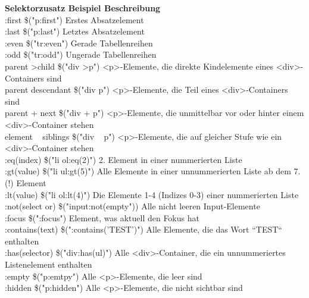 \documentclass[10pt]{article}
\begin{document}
    \begin{tcolorbox}[
    colback=Red!5!white,
    colframe=Red!75!black,
    title={\centering Selektorenzusätze}]
        \textbf{Selektorzusatz  Beispiel  Beschreibung} \\
        :first  \$("p:first")  Erstes Absatzelement \\
        :last  \$("p:last")  Letztes Absatzelement \\
        :even  \$("tr:even")  Gerade Tabellenreihen \\
        :odd  \$("tr:odd")  Ungerade Tabellenreihen \\
        parent \textgreater  child  \$("div \textgreater  p")  \textless p\textgreater -Elemente, die direkte Kindelemente eines \textless div\textgreater -Containers sind \\
        parent descendant  \$("div p")  \textless p\textgreater -Elemente, die Teil eines \textless div\textgreater -Containers sind \\
        parent + next  \$("div + p")  \textless p\textgreater -Elemente, die unmittelbar vor oder hinter einem \textless div\textgreater -Container stehen \\
        element ~ siblings  \$("div ~ p")  \textless p\textgreater -Elemente, die auf gleicher Stufe wie ein \textless div\textgreater -Container stehen \\
        :eq(index)  \$("li ol:eq(2)")  2. Element in einer nummerierten Liste \\
        :gt(value)  \$("li ul:gt(5)")  Alle Elemente in einer unnummerierten Liste ab dem 7.(!) Element \\
        :lt(value)  \$("li ol:lt(4)")  Die Elemente 1-4 (Indizes 0-3) einer nummerierten Liste \\
        :not(select or)  \$("input:not(empty"))  Alle nicht leeren Input-Elemente \\
        :focus  \$(":focus")  Element, was aktuell den Fokus hat \\
        :contains(text)  \$(":contains('TEST')")  Alle Elemente, die das Wort “TEST“ enthalten \\
        :has(selector)  \$("div:has(ul)")  Alle \textless div\textgreater -Container, die ein unnummeriertes Listenelement enthalten \\
        :empty  \$("p:emtpy")  Alle \textless p\textgreater -Elemente, die leer sind \\
        :hidden  \$("p:hidden")  Alle \textless p\textgreater -Elemente, die nicht sichtbar sind \\

\end{tcolorbox}
\end{document}
